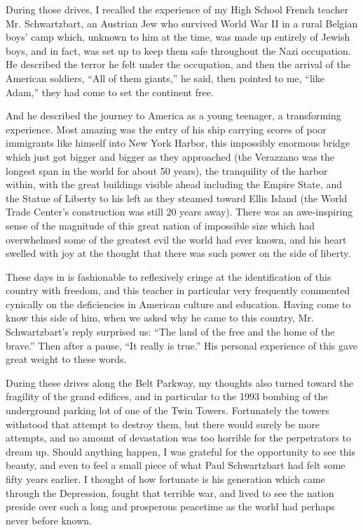 \documentclass{report}
\begin{document}
During those drives, I recalled the experience of my High School French teacher
Mr. Schwartzbart, an Austrian Jew who survived World War II in a rural Belgian
boys' camp which, unknown to him at the time, was made up entirely of Jewish
boys, and in fact, was set up to keep them safe throughout the Nazi occupation.
He described the terror he felt under the occupation, and then the arrival of
the American soldiers, ``All of them giants,'' he said, then pointed to me,
``like Adam,'' they had come to set the continent free.

And he described the journey to America as a young teenager, a transforming
experience.  Most amazing was the entry of his ship carrying scores of poor
immigrants like himself into New York Harbor, this impossibly enormous bridge
which just got bigger and bigger as they approached (the Verazzano was the
longest span in the world for about 50 years), the tranquility of the harbor
within, with the great buildings visible ahead including the Empire State, and
the Statue of Liberty to his left as they steamed toward Ellis Island (the
World Trade Center's construction was still 20 years away).  There was an
awe-inspiring sense of the magnitude of this great nation of impossible size
which had overwhelmed some of the greatest evil the world had ever known, and
his heart swelled with joy at the thought that there was such power on the side
of liberty.

These days in is fashionable to reflexively cringe at the identification of
this country with freedom, and this teacher in particular very frequently
commented cynically on the deficiencies in American culture and education.
Having come to know this side of him, when we asked why he came to this
country, Mr. Schwartzbart's reply surprised us: ``The land of the free and the
home of the brave.''  Then after a pause, ``It really is true.''  His personal
experience of this gave great weight to these words.

During these drives along the Belt Parkway, my thoughts also turned toward the
fragility of the grand edifices, and in particular to the 1993 bombing of the
underground parking lot of one of the Twin Towers.  Fortunately the towers
withstood that attempt to destroy them, but there would surely be more
attempts, and no amount of devastation was too horrible for the perpetrators to
dream up.  Should anything happen, I was grateful for the opportunity to see
this beauty, and even to feel a small piece of what Paul Schwartzbart had felt
some fifty years earlier.  I thought of how fortunate is his generation which
came through the Depression, fought that terrible war, and lived to see the
nation preside over such a long and prosperous peacetime as the world had
perhaps never before known.
\end{document}
